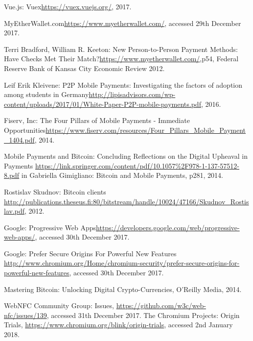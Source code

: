 \begin{thebibliography}{99}
 Vue.js: Vuex\url{https://vuex.vuejs.org/}, 2017.

 MyEtherWallet.com\url{https://www.myetherwallet.com/}, accessed 29th December 2017.

 Terri Bradford, William R. Keeton: New Person-to-Person
Payment Methods: Have Checks Met Their Match?\url{https://www.myetherwallet.com/},p54, Federal Reserve Bank of Kansas City Economic Review 2012.

 Leif Erik Kleivene: P2P Mobile Payments: Investigating the factors of adoption among students in Germany\url{http://lipisadvisors.com/wp-content/uploads/2017/01/White-Paper-P2P-mobile-payments.pdf}, 2016.

 Fiserv, Inc: The Four Pillars of Mobile Payments - Immediate Opportunities\url{https://www.fiserv.com/resources/Four_Pillars_Mobile_Payment_1404.pdf}, 2014.

Mobile Payments and Bitcoin: Concluding Reflections on the Digital Upheaval in Payments \url{https://link.springer.com/content/pdf/10.1057\%2F978-1-137-57512-8.pdf} in Gabriella Gimigliano: Bitcoin and Mobile Payments, p281, 2014.

Rostislav Skudnov: Bitcoin clients \url{http://publications.theseus.fi:80/bitstream/handle/10024/47166/Skudnov_Rostislav.pdf}, 2012.

Google: Progressive Web Apps\url{https://developers.google.com/web/progressive-web-apps/}, accessed 30th December 2017.

Google: Prefer Secure Origins For Powerful New Features \url{http://www.chromium.org/Home/chromium-security/prefer-secure-origins-for-powerful-new-features}, accessed 30th December 2017.

Mastering Bitcoin: Unlocking Digital Crypto-Currencies, O'Reilly Media, 2014.

WebNFC Community Group: Issues, \url{https://github.com/w3c/web-nfc/issues/139}, accessed 31th December 2017.
The Chromium Projects: Origin Trials, \url{https://www.chromium.org/blink/origin-trials}, accessed 2nd January 2018.

\end{thebibliography}
